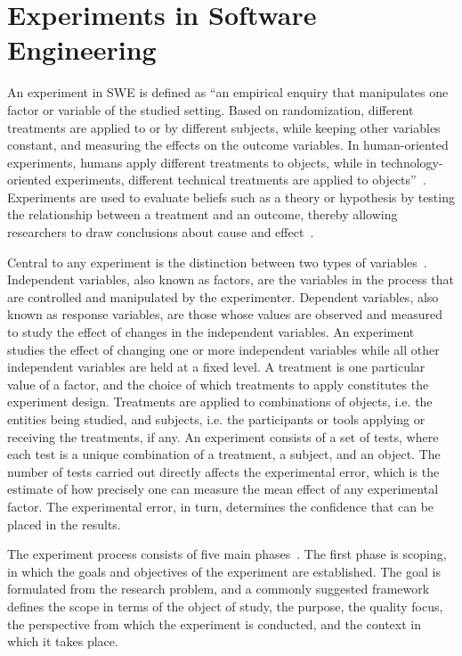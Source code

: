 \documentclass[
english,                 %
bibtex,                  %
includeExtraAbstracts, %
]{kththesis}
\numberwithin{listing}{chapter}
\begin{document}
\section{Experiments in Software Engineering}

An experiment in \gls{SWE} is defined as ``an empirical enquiry that manipulates one factor or variable of the studied setting. Based on randomization, different treatments are applied to or by different subjects, while keeping other variables constant, and measuring the effects on the outcome variables. In human-oriented experiments, humans apply different treatments to objects, while in technology-oriented experiments, different technical treatments are applied to objects''~\cite{wohlin_experimentation_2024}. Experiments are used to evaluate beliefs such as a theory or hypothesis by testing the relationship between a treatment and an outcome, thereby allowing researchers to draw conclusions about cause and effect~\cite{bacon_novum_1995}.

Central to any experiment is the distinction between two types of variables~\cite{wohlin_experimentation_2024}. Independent variables, also known as factors, are the variables in the process that are controlled and manipulated by the experimenter. Dependent variables, also known as response variables, are those whose values are observed and measured to study the effect of changes in the independent variables. An experiment studies the effect of changing one or more independent variables while all other independent variables are held at a fixed level. A treatment is one particular value of a factor, and the choice of which treatments to apply constitutes the experiment design. Treatments are applied to combinations of objects, i.e. the entities being studied, and subjects, i.e. the participants or tools applying or receiving the treatments, if any. An experiment consists of a set of tests, where each test is a unique combination of a treatment, a subject, and an object. The number of tests carried out directly affects the experimental error, which is the estimate of how precisely one can measure the mean effect of any experimental factor. The experimental error, in turn, determines the confidence that can be placed in the results.

The experiment process consists of five main phases~\cite{wohlin_experimentation_2024}. The first phase is scoping, in which the goals and objectives of the experiment are established. The goal is formulated from the research problem, and a commonly suggested framework defines the scope in terms of the object of study, the purpose, the quality focus, the perspective from which the experiment is conducted, and the context in which it takes place.
\end{document}
